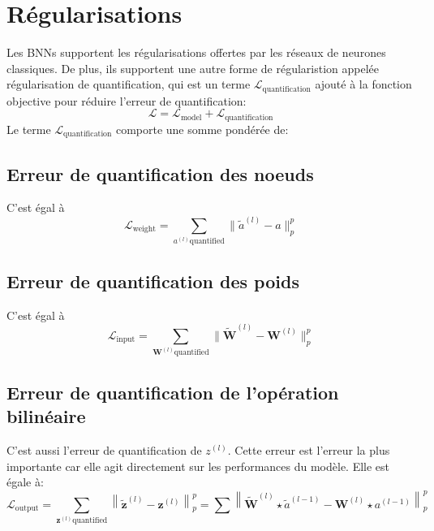 \section{Régularisations}
Les BNNs supportent les régularisations offertes par les réseaux de neurones classiques.
\newline De plus, ils supportent une autre forme de régularistion appelée régularisation de quantification, qui est un terme $\mathcal{L}_{\text{quantification}}$ ajouté à la fonction objective pour réduire l'erreur de quantification:
\begin{equation}
	\mathcal{L}=\mathcal{L}_{\text{model}} + \mathcal{L}_{\text{quantification}}
\end{equation}
Le terme $\mathcal{L}_{\text{quantification}}$ comporte une somme pondérée de:
\subsection{Erreur de quantification des noeuds}
C'est égal à 
\begin{equation}
	\mathcal{L}_{\text{weight}}=\sum_{a^{(l)} \text{quantified}} \lVert \tilde{a}^{(l)} - a \rVert_p^p
\end{equation}
\subsection{Erreur de quantification des poids}
C'est égal à 
\begin{equation}
	\mathcal{L}_{\text{input}}=\sum_{\boldsymbol{W}^{(l)} \text{quantified}} \lVert \tilde{\boldsymbol{W}}^{(l)} - \boldsymbol{W}^{(l)} \rVert_p^p
\end{equation}
\subsection{Erreur de quantification de l'opération bilinéaire}
C'est aussi l'erreur de quantification de $z^{(l)}.$ 
\newline Cette erreur est l'erreur la plus importante car elle agit directement sur les performances du modèle.
\newline Elle est égale à:
\begin{equation}
	\mathcal{L}_{\text{output}}=\sum_{\boldsymbol{z}^{(l)} \text{quantified}} \left\lVert \tilde{\boldsymbol{z}}^{(l)} - \boldsymbol{z}^{(l)}  \right\rVert_p^p = \sum \left \lVert \tilde{\boldsymbol{W}}^{(l)} \star \tilde{a}^{(l-1)} - \boldsymbol{W}^{(l)} \star a^{(l-1)} \right\rVert_p^p 
\end{equation}